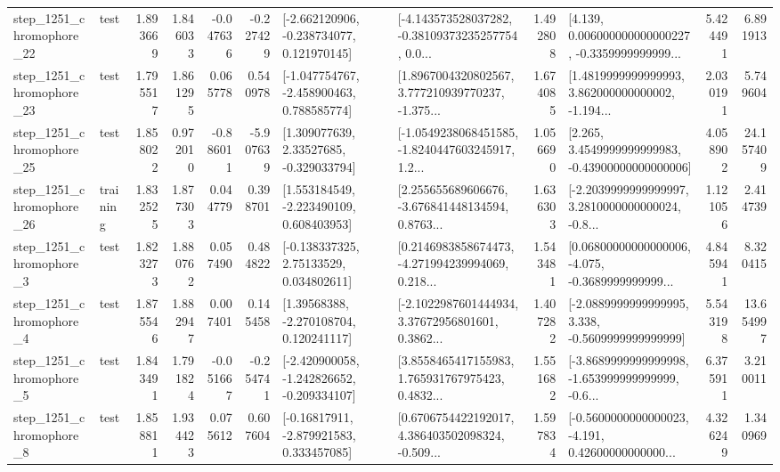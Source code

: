 \begin{tabular}{llrrrrllrlrr}
 step\_1251\_chromophore\_22 &      test &      1.893669 &    1.846033 &     -0.047636 & -0.227429 &   [-2.662120906, -0.238734077, 0.121970145] &  [-4.143573528037282, -0.38109373235257754, 0.0... &       1.492808 &  [4.139, 0.006000000000000227, -0.3359999999999... &            5.424491 &          6.891913 \\
 step\_1251\_chromophore\_23 &      test &      1.795517 &    1.861295 &      0.065778 &  0.540978 &   [-1.047754767, -2.458900463, 0.788585774] &  [1.8967004320802567, 3.777210939770237, -1.375... &       1.674085 &  [1.4819999999999993, 3.862000000000002, -1.194... &            2.030191 &          5.749604 \\
 step\_1251\_chromophore\_25 &      test &      1.858022 &    0.972010 &     -0.886011 & -5.907639 &     [1.309077639, 2.33527685, -0.329033794] &  [-1.0549238068451585, -1.8240447603245917, 1.2... &       1.056690 &  [2.265, 3.4549999999999983, -0.43900000000000006] &            4.058902 &         24.157409 \\
 step\_1251\_chromophore\_26 &  training &      1.832525 &    1.877303 &      0.044779 &  0.398701 &    [1.553184549, -2.223490109, 0.608403953] &  [2.255655689606676, -3.676841448134594, 0.8763... &       1.636303 &  [-2.2039999999999997, 3.2810000000000024, -0.8... &            1.121056 &          2.414739 \\
  step\_1251\_chromophore\_3 &      test &      1.823273 &    1.880762 &      0.057490 &  0.484822 &     [-0.138337325, 2.75133529, 0.034802611] &  [0.2146983858674473, -4.271994239994069, 0.218... &       1.543481 &  [0.06800000000000006, -4.075, -0.3689999999999... &            4.845941 &          8.320415 \\
  step\_1251\_chromophore\_4 &      test &      1.875546 &    1.882947 &      0.007401 &  0.145458 &     [1.39568388, -2.270108704, 0.120241117] &  [-2.1022987601444934, 3.37672956801601, 0.3862... &       1.407282 &  [-2.0889999999999995, 3.338, -0.5609999999999999] &            5.543198 &         13.654997 \\
  step\_1251\_chromophore\_5 &      test &      1.843491 &    1.791824 &     -0.051667 & -0.254741 &  [-2.420900058, -1.242826652, -0.209334107] &  [3.8558465417155983, 1.765931767975423, 0.4832... &       1.551682 &  [-3.8689999999999998, -1.653999999999999, -0.6... &            6.375911 &          3.210011 \\
  step\_1251\_chromophore\_8 &      test &      1.858811 &    1.934423 &      0.075612 &  0.607604 &    [-0.16817911, -2.879921583, 0.333457085] &  [0.6706754422192017, 4.386403502098324, -0.509... &       1.597834 &  [-0.5600000000000023, -4.191, 0.42600000000000... &            4.326249 &          1.340969 \\

\end{tabular}
